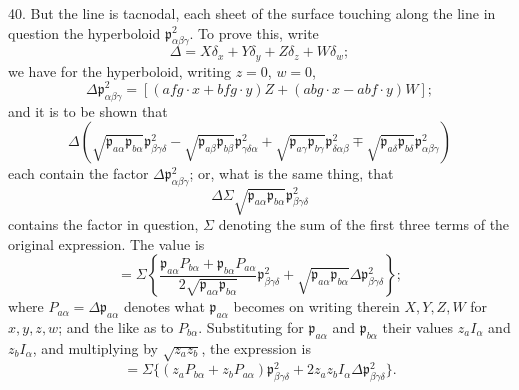 \documentclass[11pt,a4paper]{article}
\newcommand{\p}{\mathfrak p}
\newcommand{\sym}[1]{\mathit{#1}}
\newcommand{\surf}[1]{\par\smallskip\noindent{\itshape \{Surface $#1$.\}}\par\smallskip}
\begin{document}
40. But the line is tacnodal, each sheet of the surface touching along the line in
question the hyperboloid $\p^2_{\alpha\beta\gamma}$. To prove this, write
\[
\Delta=X\delta_x+Y\delta_y+Z\delta_z+W\delta_w;
\]
we have for the hyperboloid, writing $z=0$, $w=0$,
\[
\Delta\p^2_{\alpha\beta\gamma}
=[(\sym{afg}\cdot x+\sym{bfg}\cdot y)Z
  +(\sym{abg}\cdot x-\sym{abf}\cdot y)W];
\]
and it is to be shown that
\[
\Delta(\sqrt{\p_{a\alpha}\p_{b\alpha}}\p^2_{\beta\gamma\delta}
-\sqrt{\p_{a\beta}\p_{b\beta}}\p^2_{\gamma\delta\alpha}
+\sqrt{\p_{a\gamma}\p_{b\gamma}}\p^2_{\delta\alpha\beta}
\mp\sqrt{\p_{a\delta}\p_{b\delta}}\p^2_{\alpha\beta\gamma})
\]
each contain the factor $\Delta\p^2_{\alpha\beta\gamma}$; or, what is the same thing,
that
\[
\Delta\Sigma\sqrt{\p_{a\alpha}\p_{b\alpha}}\p^2_{\beta\gamma\delta}
\]
contains the factor in question, $\Sigma$ denoting the sum of the first three terms
of the original expression. The value is
\[
=\Sigma\left\{
\frac{\p_{a\alpha}P_{b\alpha}+\p_{b\alpha}P_{a\alpha}}
     {2\sqrt{\p_{a\alpha}\p_{b\alpha}}}\p^2_{\beta\gamma\delta}
+\sqrt{\p_{a\alpha}\p_{b\alpha}}\Delta\p^2_{\beta\gamma\delta}
\right\};
\]
where $P_{a\alpha}=\Delta\p_{a\alpha}$ denotes what $\p_{a\alpha}$ becomes on
writing therein $X,Y,Z,W$ for $x,y,z,w$; and the like as to $P_{b\alpha}$.
Substituting for $\p_{a\alpha}$ and $\p_{b\alpha}$ their values $z_aI_\alpha$ and
$z_bI_\alpha$, and multiplying by $\sqrt{z_az_b}$, the expression is
\[
=\Sigma\{(z_aP_{b\alpha}+z_bP_{a\alpha})\p^2_{\beta\gamma\delta}
+2z_az_bI_\alpha\Delta\p^2_{\beta\gamma\delta}\}.
\]
\surf{abcd\alpha\beta}
\end{document}
